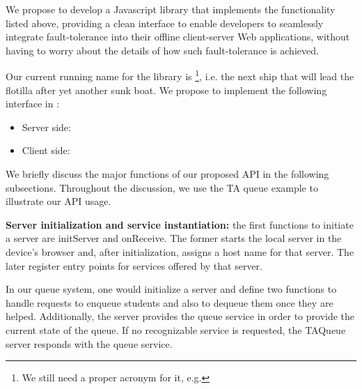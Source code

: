 We propose to develop a Javascript library that implements the functionality listed above, providing a clean interface to enable developers to seamlessly integrate fault-tolerance into their offline client-server Web applications, without having to worry about the details of how such fault-tolerance is achieved.



Our current running name for the library is \texttt{\APIName}\footnote{We still need a proper acronym for it, e.g. \APIshort}, i.e. the next ship that will lead the flotilla after yet another sunk boat. We propose to implement the following interface in \APIName:


\begin{itemize}
	\item Server side:
    \begin{itemize}
    \end{itemize}
    \item Client side:
    	\begin{itemize}
    	\end{itemize}
\end{itemize}


We briefly discuss the major functions of our proposed API in the following subsections. Throughout the discussion, we use the TA queue example to illustrate our API usage.

{\bf Server initialization and service instantiation: } the first functions to initiate a server are {\ttfamily initServer} and {\ttfamily onReceive}. The former starts the local server in the device's browser and, after initialization, assigns a host name for that server. The later register entry points for services offered by that server.

In our queue system, one would initialize a server and define two functions to handle requests to enqueue students and also to dequeue them once they are helped. Additionally, the server provides the queue service in order to provide the current state of the queue. If no recognizable service is requested, the TAQueue server responds with the queue service.

